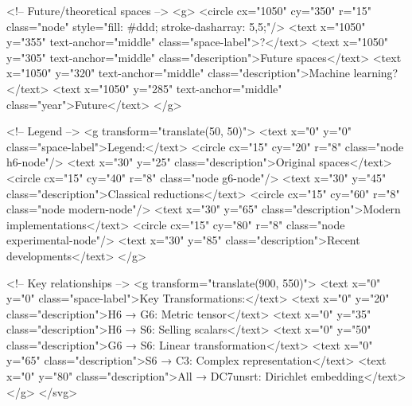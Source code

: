 <!-- Future/theoretical spaces -->
<g>
<circle cx="1050" cy="350" r="15" class="node" style="fill: #ddd; stroke-dasharray: 5,5;"/>
<text x="1050" y="355" text-anchor="middle" class="space-label">?</text>
<text x="1050" y="305" text-anchor="middle" class="description">Future spaces</text>
<text x="1050" y="320" text-anchor="middle" class="description">Machine learning?</text>
<text x="1050" y="285" text-anchor="middle" class="year">Future</text>
</g>

<!-- Legend -->
<g transform="translate(50, 50)">
<text x="0" y="0" class="space-label">Legend:</text>
<circle cx="15" cy="20" r="8" class="node h6-node"/>
<text x="30" y="25" class="description">Original spaces</text>
<circle cx="15" cy="40" r="8" class="node g6-node"/>
<text x="30" y="45" class="description">Classical reductions</text>
<circle cx="15" cy="60" r="8" class="node modern-node"/>
<text x="30" y="65" class="description">Modern implementations</text>
<circle cx="15" cy="80" r="8" class="node experimental-node"/>
<text x="30" y="85" class="description">Recent developments</text>
</g>

<!-- Key relationships -->
<g transform="translate(900, 550)">
<text x="0" y="0" class="space-label">Key Transformations:</text>
<text x="0" y="20" class="description">H6 → G6: Metric tensor</text>
<text x="0" y="35" class="description">H6 → S6: Selling scalars</text>
<text x="0" y="50" class="description">G6 → S6: Linear transformation</text>
<text x="0" y="65" class="description">S6 → C3: Complex representation</text>
<text x="0" y="80" class="description">All → DC7unsrt: Dirichlet embedding</text>
</g>
</svg>